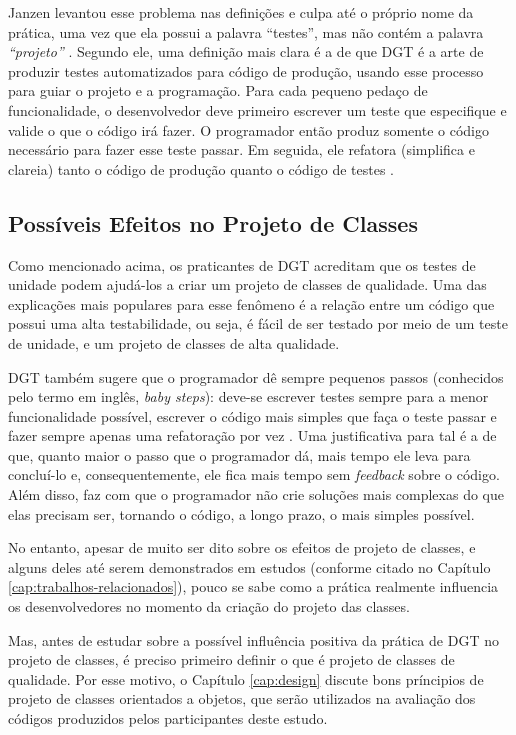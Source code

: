 Janzen levantou esse problema nas definições e culpa até o próprio nome da prática, uma vez
que ela possui a palavra ``testes'', mas não contém a palavra \textit{``projeto''} 
\cite{tdd-really-improve}.
Segundo ele, uma definição mais clara é a de que DGT é a arte de produzir testes
automatizados para código de produção, usando esse processo para guiar o projeto e a programação.
Para cada pequeno pedaço de funcionalidade, o desenvolvedor deve primeiro
escrever um teste que especifique e valide o que o código irá fazer. O
programador então produz somente o código necessário para fazer esse teste
passar. Em seguida, ele refatora (simplifica e clareia) tanto o código de produção
quanto o código de testes \cite{agilealliance-tdd} \cite{tdd-taxonomy}.

\subsection{Possíveis Efeitos no Projeto de Classes}

Como mencionado acima, os praticantes de DGT acreditam que os testes de unidade
podem ajudá-los a criar um projeto de classes de qualidade. Uma das explicações mais
populares para esse fenômeno é a relação
entre um código que possui uma alta testabilidade, ou seja, é fácil de ser testado
por meio de um teste de unidade, e um projeto de classes de alta qualidade.

DGT também sugere que o programador dê sempre pequenos passos (conhecidos pelo termo em
inglês, \textit{baby steps}): deve-se escrever testes sempre para a menor
funcionalidade possível, escrever o código mais simples que faça o teste passar
e fazer sempre apenas uma refatoração por vez \cite{TDDByExample}.
Uma justificativa para tal é a de que, quanto maior o passo que o programador dá, mais
tempo ele leva para concluí-lo e, consequentemente, ele fica mais tempo
sem \textit{feedback} sobre o código. Além disso, faz com que o programador não crie
soluções mais complexas do que elas precisam ser, tornando o código, a longo
prazo, o mais simples possível.

No entanto, apesar de muito ser dito sobre os efeitos de projeto de classes, e alguns deles
até serem demonstrados em estudos (conforme citado no Capítulo \ref{cap:trabalhos-relacionados}), 
pouco se sabe como a prática realmente influencia os desenvolvedores no momento da criação do
projeto das classes.

Mas, antes de estudar sobre a possível influência positiva da prática de DGT no projeto de classes,
é preciso primeiro definir o que é projeto de classes de qualidade. Por esse motivo, o 
Capítulo \ref{cap:design}
discute bons príncipios de projeto de classes orientados a objetos, que serão utilizados
na avaliação dos códigos produzidos pelos participantes deste estudo.
